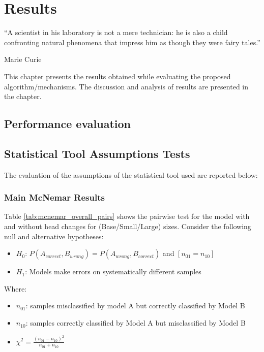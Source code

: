 \chapter{Results}
\epigraph{``A scientist in his laboratory is not a mere technician: he is also a child confronting natural phenomena that impress him as though they were fairy tales.''}{\vspace{10pt}Marie Curie}
\label{chapter:results}
\newpage

This chapter presents the results obtained while evaluating the proposed algorithm/mechanisms. The discussion and analysis of results are presented in the  chapter.


\section{Performance evaluation}
 
\section{Statistical Tool Assumptions Tests}

The evaluation of the assumptions of the statistical tool used are reported below:

\subsection{Main McNemar Results}

Table \ref{tab:mcnemar_overall_pairs} shows the pairwise test for the model with and without head changes for (Base/Small/Large) sizes.  Consider the following null and alternative hypotheses:

\begin{itemize}
\item  $H_0$: $P(A_{correct}, B_{wrong}) = P(A_{wrong}, B_{correct})$ and $[n_{01} = n_{10}]$
\item $H_1$: Models make errors on systematically different samples
\end{itemize}
 
Where: 

\begin{itemize}
\item $n_{01}$: samples misclassified by model A but correctly classified by Model B
\item $n_{10}$: samples correctly classified by Model A but misclassified by Model B
\item $\chi^2=\frac{\left(n_{01}-n_{10}\right)^2}{n_{01}+n_{10}}$
\end{itemize}


